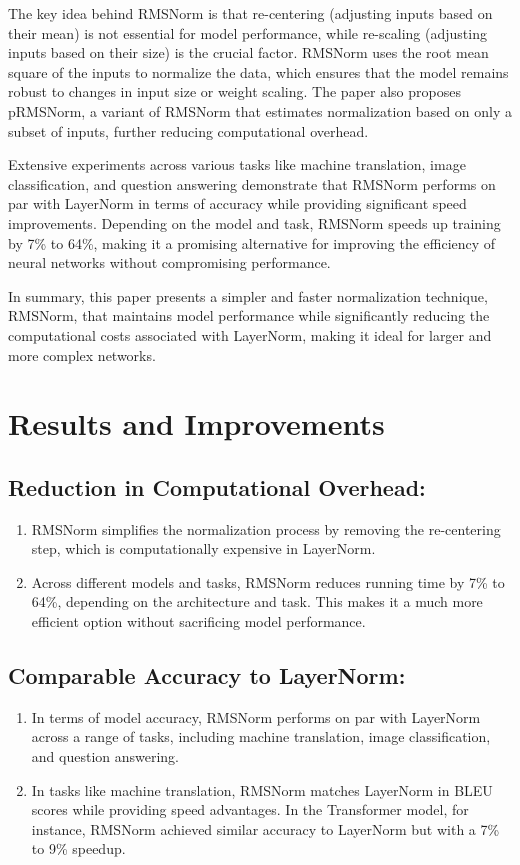 \documentclass{report}
\begin{document}
	
	The key idea behind RMSNorm is that re-centering (adjusting inputs based on their mean) is not essential for model performance, while re-scaling (adjusting inputs based on their size) is the crucial factor. RMSNorm uses the root mean square of the inputs to normalize the data, which ensures that the model remains robust to changes in input size or weight scaling. The paper also proposes pRMSNorm, a variant of RMSNorm that estimates normalization based on only a subset of inputs, further reducing computational overhead.
	
	
	Extensive experiments across various tasks like machine translation, image classification, and question answering demonstrate that RMSNorm performs on par with LayerNorm in terms of accuracy while providing significant speed improvements. Depending on the model and task, RMSNorm speeds up training by 7\% to 64\%, making it a promising alternative for improving the efficiency of neural networks without compromising performance.
	
	
	In summary, this paper presents a simpler and faster normalization technique, RMSNorm, that maintains model performance while significantly reducing the computational costs associated with LayerNorm, making it ideal for larger and more complex networks.
	
	
	\section{Results and Improvements}
	\subsection{Reduction in Computational Overhead:}
	\begin{enumerate}
		\item 
		RMSNorm simplifies the normalization process by removing the re-centering step, which is computationally expensive in LayerNorm.
		
		\item 
		Across different models and tasks, RMSNorm reduces running time by 7\% to 64\%, depending on the architecture and task. This makes it a much more efficient option without sacrificing model performance.
	\end{enumerate}
	
	
	\subsection{Comparable Accuracy to LayerNorm:}
	\begin{enumerate}
		\item 
		In terms of model accuracy, RMSNorm performs on par with LayerNorm across a range of tasks, including machine translation, image classification, and question answering.
		
		\item 
		In tasks like machine translation, RMSNorm matches LayerNorm in BLEU scores while providing speed advantages. In the Transformer model, for instance, RMSNorm achieved similar accuracy to LayerNorm but with a 7\% to 9\% speedup.
	\end{enumerate}
	
\end{document}
